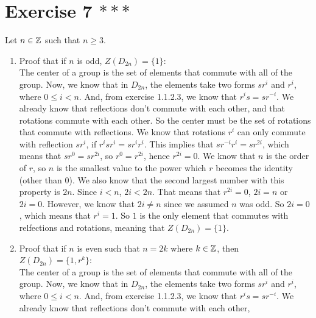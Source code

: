 \documentclass[12pt]{article}
\begin{document}
    \section*{Exercise 7 $***$}
    Let $n \in \mathbb{Z}$ such that $n \geqslant 3$. \\
    \begin{enumerate}[label=\textbf{\alph*.}]
        \item    
            Proof that if $n$ is odd, $Z(D_{2n}) = \{1\}$: \\
            The center of a group is the set of elements that commute
            with all of the group.
            Now, we know that in $D_{2n}$,
            the elements take two forms $sr^i$ and $r^i$,
            where $0 \leqslant i < n$.
            And, from exercise 1.1.2.3, we know that $r^is = sr^{-i}$.
            We already know that reflections don't commute with each other,
            and that rotations commute with each other.
            So the center must be the set of rotations that commute with
            reflections.
            We know that rotations $r^i$ can only commute with
            reflection $sr^i$,
            if $r^isr^i = sr^ir^i$.
            This implies that $sr^{-i}r^i = sr^{2i}$,
            which means that $sr^{0} = sr^{2i}$,
            so $r^{0} = r^{2i}$,
            hence $r^{2i} = 0$.
            We know that $n$ is the order of $r$,
            so $n$ is the smallest value to the power which $r$
            becomes the identity (other than 0).
            We also know that the second largest number with this
            property is $2n$.
            Since $i < n$, $2i < 2n$.
            That means that $r^{2i} = 0$, $2i = n$ or $2i = 0$.
            However, we know that $2i \neq n$ since we assumed $n$ was odd.
            So $2i = 0$, which means that $r^i = 1$.
            So $1$ is the only element that commutes with relfections
            and rotations,
            meaning that $Z(D_{2n}) = \{1\}$.
        \item
            Proof that if $n$ is even such that $n = 2k$ where $k \in \mathbb{Z}$,
            then $Z(D_{2n}) = \{1, r^k\}$: \\
            The center of a group is the set of elements that commute
            with all of the group.
            Now, we know that in $D_{2n}$,
            the elements take two forms $sr^i$ and $r^i$,
            where $0 \leqslant i < n$.
            And, from exercise 1.1.2.3, we know that $r^is = sr^{-i}$.
            We already know that reflections don't commute with each other,

\end{enumerate}
\end{document}
